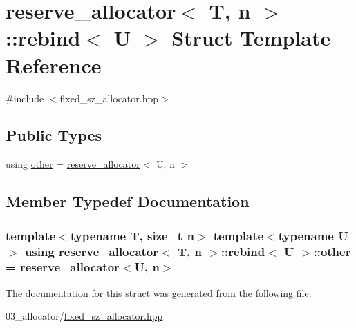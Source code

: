 \hypertarget{structreserve__allocator_1_1rebind}{}\section{reserve\+\_\+allocator$<$ T, n $>$\+:\+:rebind$<$ U $>$ Struct Template Reference}
\label{structreserve__allocator_1_1rebind}


{\ttfamily \#include $<$fixed\+\_\+sz\+\_\+allocator.\+hpp$>$}

\subsection*{Public Types}
\begin{DoxyCompactItemize}
\item 
using \hyperlink{structreserve__allocator_1_1rebind_af27cf2f406516c007785b5b29e1c2ec7}{other} = \hyperlink{classreserve__allocator}{reserve\+\_\+allocator}$<$ U, n $>$
\end{DoxyCompactItemize}


\subsection{Member Typedef Documentation}
\subsubsection[{\texorpdfstring{other}{other}}]{\setlength{\rightskip}{0pt plus 5cm}template$<$typename T, size\+\_\+t n$>$ template$<$typename U $>$ using {\bf reserve\+\_\+allocator}$<$ T, n $>$\+::{\bf rebind}$<$ U $>$\+::{\bf other} =  {\bf reserve\+\_\+allocator}$<$U, n$>$}\hypertarget{structreserve__allocator_1_1rebind_af27cf2f406516c007785b5b29e1c2ec7}{}\label{structreserve__allocator_1_1rebind_af27cf2f406516c007785b5b29e1c2ec7}


The documentation for this struct was generated from the following file\+:\begin{DoxyCompactItemize}
\item 
03\+\_\+allocator/\hyperlink{fixed__sz__allocator_8hpp}{fixed\+\_\+sz\+\_\+allocator.\+hpp}\end{DoxyCompactItemize}
